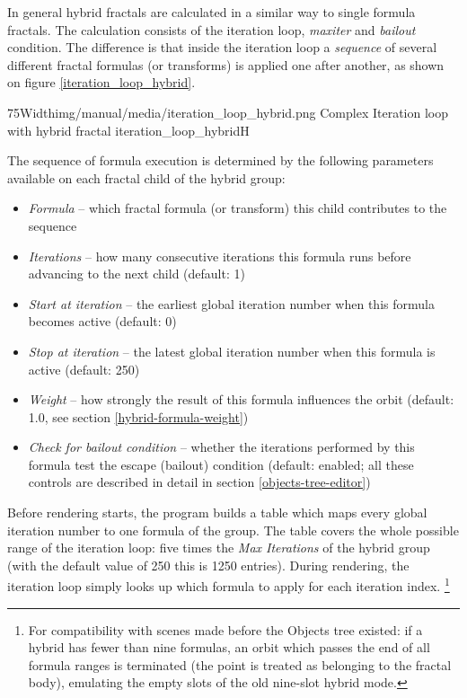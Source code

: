In general hybrid fractals are calculated in a similar way to single formula fractals.
The calculation consists of the iteration loop, \emph{maxiter} and \emph{bailout} condition. The
difference is that inside the iteration loop a \emph{sequence} of several different fractal formulas (or transforms) is applied one after another, as shown on figure \ref{iteration_loop_hybrid}.

\simpleImageWithCaption75Width{img/manual/media/iteration_loop_hybrid.png}
{Complex Iteration loop with hybrid fractal}
{iteration_loop_hybrid}{H}

The sequence of formula execution is determined by the following parameters available on each fractal child of the hybrid group:
\begin{itemize}
	\item \emph{Formula} -- which fractal formula (or transform) this child contributes to the sequence
	\item \emph{Iterations} -- how many consecutive iterations this formula runs before advancing to the next child (default: 1)
	\item \emph{Start at iteration} -- the earliest global iteration number when this formula becomes active (default: 0)
	\item \emph{Stop at iteration} -- the latest global iteration number when this formula is active (default: 250)
	\item \emph{Weight} -- how strongly the result of this formula influences the orbit (default: 1.0, see section \ref{hybrid-formula-weight})
	\item \emph{Check for bailout condition} -- whether the iterations performed by this formula test the escape (bailout) condition (default: enabled; all these controls are described in detail in section \ref{objects-tree-editor})
\end{itemize}

Before rendering starts, the program builds a table which maps every global iteration number
to one formula of the group. The table covers the whole possible range of the iteration loop:
five times the \emph{Max Iterations} of the hybrid group (with the default value of 250 this is
1250 entries). During rendering, the iteration loop simply looks up which formula to apply for
each iteration index.
\footnote{For compatibility with scenes made before the Objects tree existed: if a hybrid has
	fewer than nine formulas, an orbit which passes the end of all formula ranges is terminated
	(the point is treated as belonging to the fractal body), emulating the empty slots of the
	old nine-slot hybrid mode.}

